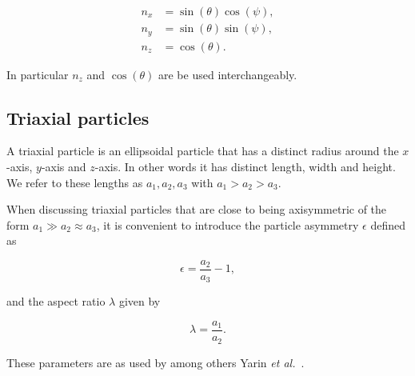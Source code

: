 \begin{subequations}\label{eq:nzEq}
\begin{align}
n_x 	&= \sin(\theta)\cos(\psi), \\
n_y 	&= \sin(\theta)\sin(\psi),\\
n_z		&= \cos(\theta).
\end{align}
\end{subequations}

\noindent In particular $n_z$ and $\cos(\theta)$ are be used interchangeably.

\subsection{Triaxial particles}
A triaxial particle is an ellipsoidal particle that has a distinct radius around the $x$-axis, $y$-axis and $z$-axis. In other words it has distinct length, width and height. We refer to these lengths as $a_1, a_2, a_3$ with $a_1 > a_2 > a_3$.


When discussing triaxial particles that are close to being axisymmetric of the form $a_1 \gg a_2 \approx a_3$, it is convenient to introduce the particle asymmetry $\epsilon$ defined as

\begin{equation}\label{eq:epsilon}
\epsilon = \frac{a_2}{a_3} - 1,
\end{equation}

\noindent and the aspect ratio $\lambda$ given by

\begin{equation}\label{eq:lambda}
\lambda = \frac{a_1}{a_2}.
\end{equation}

These parameters are as used by among others Yarin \emph{et al.}~\cite{Yarin}.



